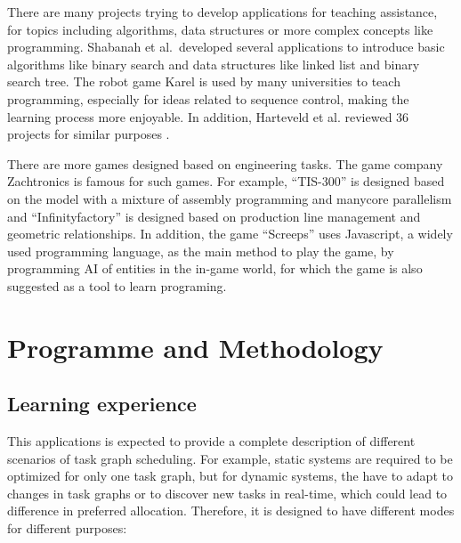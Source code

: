 \documentclass[a4paper,11pt]{article}
\begin{document}
There are many projects trying to develop applications for teaching assistance, for topics including algorithms, data structures or more complex concepts like programming. Shabanah et al.\ developed several applications to introduce basic algorithms like binary search and data structures like linked list and binary search tree\cite{Shabanah2010}. The robot game Karel is used by many universities to teach programming, especially for ideas related to sequence control, making the learning process more enjoyable\cite{Becker2001}. In addition, Harteveld et al. reviewed 36 projects for similar purposes \cite{Harteveld}.

There are more games designed based on engineering tasks. The game company Zachtronics is famous for such games. For example, ``TIS-300'' is designed based on the model with a mixture of assembly programming and manycore parallelism and ``Infinityfactory'' is designed based on production line management and geometric relationships. In addition, the game ``Screeps'' uses Javascript, a widely used programming language, as the main method to play the game, by programming AI of entities in the in-game world, for which the game is also suggested as a tool to learn programing.

\section{Programme and Methodology}

\subsection{Learning experience} \label{sec:modes}

This applications is expected to provide a complete description of different scenarios of task graph scheduling. For example, static systems are required to be optimized for only one task graph, but for dynamic systems, the have to adapt to changes in task graphs or to discover new tasks in real-time, which could lead to difference in preferred allocation. Therefore, it is designed to have different modes for different purposes:
\end{document}
